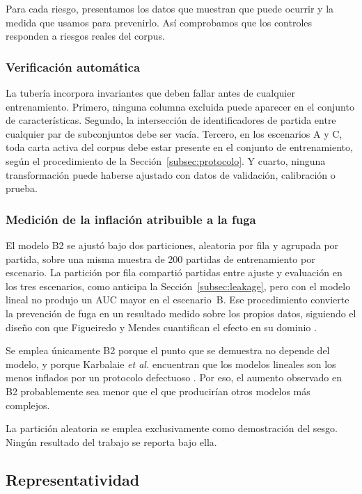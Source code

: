 Para cada riesgo, presentamos los datos que muestran que puede ocurrir y la
medida que usamos para prevenirlo. Así comprobamos que los controles
responden a riesgos reales del corpus.

\subsubsection{Verificación automática}

La tubería incorpora invariantes que deben fallar antes de cualquier
entrenamiento. Primero, ninguna columna excluida puede aparecer en el
conjunto de características. Segundo, la intersección de identificadores de
partida entre cualquier par de subconjuntos debe ser vacía. Tercero, en los
escenarios A y C, toda carta activa del corpus debe estar presente en el
conjunto de entrenamiento, según el procedimiento de la
Sección~\ref{subsec:protocolo}. Y cuarto, ninguna
transformación puede haberse ajustado con datos de validación, calibración o
prueba.

\subsubsection{Medición de la inflación atribuible a la fuga}

El modelo B2 se ajustó bajo dos particiones, aleatoria por fila y agrupada
por partida, sobre una misma muestra de 200 partidas de entrenamiento por
escenario. La partición por fila compartió partidas entre ajuste y
evaluación en los tres escenarios, como anticipa la
Sección~\ref{subsec:leakage}, pero con el modelo lineal no produjo un AUC
mayor en el escenario~B. Ese procedimiento
convierte la prevención de fuga en un resultado medido sobre los propios
datos, siguiendo el diseño con que Figueiredo y Mendes cuantifican el efecto
en su dominio \cite{figueiredo_leakage_2024}.

Se emplea únicamente B2 porque el punto que se demuestra no depende del
modelo, y porque Karbalaie \textit{et al.} encuentran que los modelos
lineales son los menos inflados por un protocolo defectuoso
\cite{karbalaie_participantaware_2026}. Por eso, el aumento observado en B2
probablemente sea menor que el que producirían otros modelos más complejos.

La partición aleatoria se emplea exclusivamente como demostración del sesgo.
Ningún resultado del trabajo se reporta bajo ella.

\subsection{Representatividad}
\label{subsec:representatividad}

